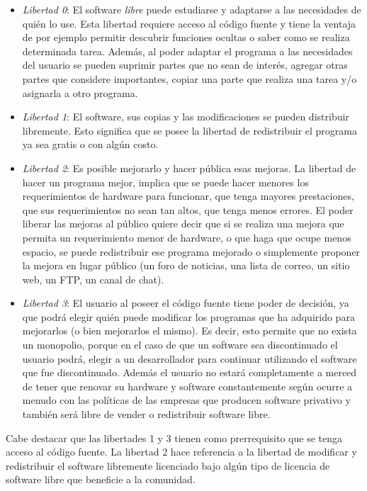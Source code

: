 \begin{itemize}
\item \textit{Libertad 0}: El software \textit{libre} puede estudiarse y adaptarse a las necesidades de quién lo use. Esta
  libertad requiere acceso al código fuente y tiene la ventaja de por
  ejemplo permitir descubrir funciones ocultas o saber como se realiza
  determinada tarea. Además, al poder adaptar el programa a las
  necesidades del usuario se pueden suprimir partes que no sean de
  interés, agregar otras partes que considere importantes, copiar
  una parte que realiza una tarea y/o asignarla a otro programa.
\item \textit{Libertad 1}: El software, sus copias y las
  modificaciones se pueden distribuir libremente. Esto significa que
  se posee la libertad de redistribuir el programa ya sea gratis o con
  algún costo.
\item \textit{Libertad 2}: Es posible mejorarlo y hacer pública esas
  mejoras. La libertad de hacer un programa mejor, implica que se
  puede hacer menores los requerimientos de hardware para funcionar,
  que tenga mayores prestaciones, que sus requerimientos no sean tan
  altos, que tenga menos errores. El poder liberar las mejoras al
  público quiere decir que si se realiza una mejora que permita un
  requerimiento menor de hardware, o que haga que ocupe menos espacio,
  se puede redistribuir ese programa mejorado o simplemente proponer
  la mejora en lugar público (un foro de noticias, una lista de
  correo, un sitio web, un FTP, un canal de chat).
\item \textit{Libertad 3}: El usuario al poseer el código fuente tiene
  poder de decisión, ya que podrá elegir quién puede modificar los
  programas que ha adquirido para mejorarlos (o bien mejorarlos el
  mismo). Es decir, esto permite que no exista un monopolio, porque en
  el caso de que un software sea discontinuado el usuario podrá,
  elegir a un desarrollador para continuar utilizando el software que
  fue discontinuado. Además el usuario no estará completamente a
  merced de tener que renovar su hardware y software constantemente
  según ocurre a menudo con las políticas de las empresas que producen
  software privativo y también será libre de vender o redistribuir
  software libre.
\end{itemize}

Cabe destacar que las libertades 1 y 3 tienen como prerrequisito que
se tenga acceso al código fuente. La libertad 2 hace referencia a la
libertad de modificar y redistribuir el software libremente licenciado
bajo algún tipo de licencia de software libre que beneficie a la
comunidad.


